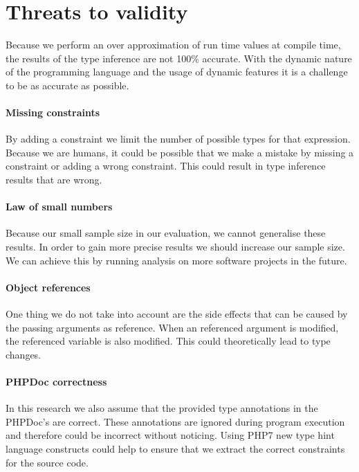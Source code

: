 \documentclass[main.tex]{subfiles}
\begin{document}
    \section{Threats to validity}\label{conclusion:threats-to-validity}	
    Because we perform an over approximation of run time values at compile time, the results of the type inference are not 100\% accurate.
    With the dynamic nature of the programming language and the usage of dynamic features it is a challenge to be as accurate as possible.
		
	\paragraph{Missing constraints}
	By adding a constraint we limit the number of possible types for that expression.
	Because we are humans, it could be possible that we make a mistake by missing a constraint or adding a wrong constraint.
	This could result in type inference results that are wrong.
	
	\paragraph{Law of small numbers}
	Because our small sample size in our evaluation, we cannot generalise these results.
	In order to gain more precise results we should increase our sample size.
	We can achieve this by running analysis on more software projects in the future.
	
	\paragraph{Object references}
	One thing we do not take into account are the side effects that can be caused by the passing arguments as reference.
	When an referenced argument is modified, the referenced variable is also modified.
	This could theoretically lead to type changes.
	
	\paragraph{PHPDoc correctness}
	In this research we also assume that the provided type annotations in the PHPDoc's are correct.
	These annotations are ignored during program execution and therefore could be incorrect without noticing.
	Using PHP7 new type hint language constructs could help to ensure that we extract the correct constraints for the source code.

	
\end{document}
